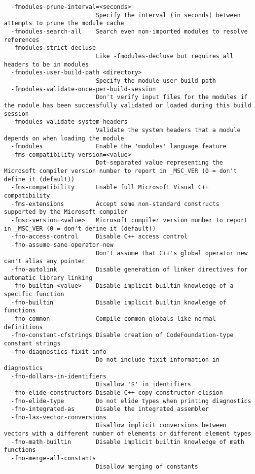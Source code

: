 \begin{verbatim}
  -fmodules-prune-interval=<seconds>
                          Specify the interval (in seconds) between attempts to prune the module cache
  -fmodules-search-all    Search even non-imported modules to resolve references
  -fmodules-strict-decluse
                          Like -fmodules-decluse but requires all headers to be in modules
  -fmodules-user-build-path <directory>
                          Specify the module user build path
  -fmodules-validate-once-per-build-session
                          Don't verify input files for the modules if the module has been successfully validated or loaded during this build session
  -fmodules-validate-system-headers
                          Validate the system headers that a module depends on when loading the module
  -fmodules               Enable the 'modules' language feature
  -fms-compatibility-version=<value>
                          Dot-separated value representing the Microsoft compiler version number to report in _MSC_VER (0 = don't define it (default))
  -fms-compatibility      Enable full Microsoft Visual C++ compatibility
  -fms-extensions         Accept some non-standard constructs supported by the Microsoft compiler
  -fmsc-version=<value>   Microsoft compiler version number to report in _MSC_VER (0 = don't define it (default))
  -fno-access-control     Disable C++ access control
  -fno-assume-sane-operator-new
                          Don't assume that C++'s global operator new can't alias any pointer
  -fno-autolink           Disable generation of linker directives for automatic library linking
  -fno-builtin-<value>    Disable implicit builtin knowledge of a specific function
  -fno-builtin            Disable implicit builtin knowledge of functions
  -fno-common             Compile common globals like normal definitions
  -fno-constant-cfstrings Disable creation of CodeFoundation-type constant strings
  -fno-diagnostics-fixit-info
                          Do not include fixit information in diagnostics
  -fno-dollars-in-identifiers
                          Disallow '$' in identifiers
  -fno-elide-constructors Disable C++ copy constructor elision
  -fno-elide-type         Do not elide types when printing diagnostics
  -fno-integrated-as      Disable the integrated assembler
  -fno-lax-vector-conversions
                          Disallow implicit conversions between vectors with a different number of elements or different element types
  -fno-math-builtin       Disable implicit builtin knowledge of math functions
  -fno-merge-all-constants
                          Disallow merging of constants

\end{verbatim}
